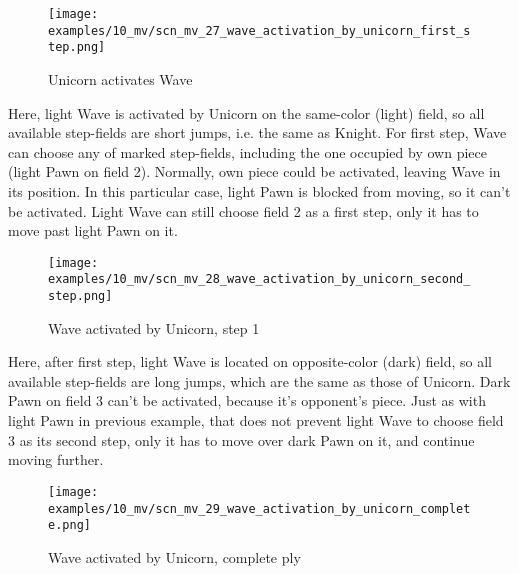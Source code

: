 \clearpage %

\vspace*{-2.1\baselineskip}
\noindent
\begin{figure}[!h]
\texttt{[image: examples/10\_mv/scn\_mv\_27\_wave\_activation\_by\_unicorn\_first\_step.png]}
\vspace*{-1.3\baselineskip}
\caption{Unicorn activates Wave}
\label{fig:scn_mv_27_wave_activation_by_unicorn_first_step}
\end{figure}

\vspace*{-0.3\baselineskip}
Here, light Wave is activated by Unicorn on the same-color (light) field, so all available
step-fields are short jumps, i.e. the same as Knight. For first step, Wave can choose any of
marked step-fields, including the one occupied by own piece (light Pawn on field 2). Normally,
own piece could be activated, leaving Wave in its position. In this particular case, light Pawn
is blocked from moving, so it can't be activated. Light Wave can still choose field 2 as a first
step, only it has to move past light Pawn on it.

\clearpage %

\vspace*{-2.1\baselineskip}
\noindent
\begin{figure}[!h]
\texttt{[image: examples/10\_mv/scn\_mv\_28\_wave\_activation\_by\_unicorn\_second\_step.png]}
\caption{Wave activated by Unicorn, step 1}
\label{fig:scn_mv_28_wave_activation_by_unicorn_second_step}
\end{figure}

Here, after first step, light Wave is located on opposite-color (dark) field, so all available
step-fields are long jumps, which are the same as those of Unicorn. Dark Pawn on field 3 can't be
activated, because it's opponent's piece. Just as with light Pawn in previous example, that does
not prevent light Wave to choose field 3 as its second step, only it has to move over dark Pawn
on it, and continue moving further.

\clearpage %

\vspace*{-2.1\baselineskip}
\noindent
\begin{figure}[!h]
\texttt{[image: examples/10\_mv/scn\_mv\_29\_wave\_activation\_by\_unicorn\_complete.png]}
\caption{Wave activated by Unicorn, complete ply}
\label{fig:scn_mv_29_wave_activation_by_unicorn_complete}
\end{figure}

